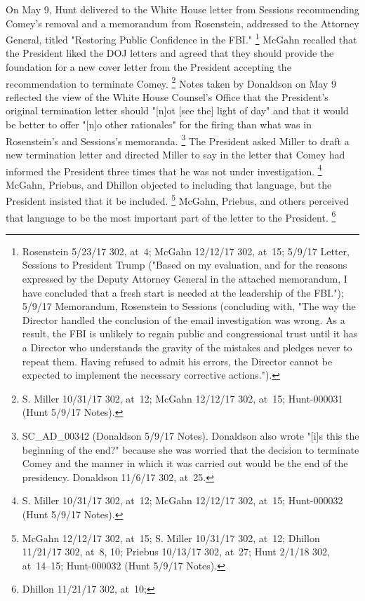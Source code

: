 {On May 9, Hunt delivered to the White House letter from Sessions recommending Comey's removal and a memorandum from Rosenstein, addressed to the Attorney General, titled "Restoring Public Confidence in the FBI."%
\footnote{Rosenstein 5/23/17 302, at~4;
McGahn 12/12/17 302, at~15;
5/9/17 Letter, Sessions to President Trump ("Based on my evaluation, and for the reasons expressed by the Deputy Attorney General in the attached memorandum, I have concluded that a fresh start is needed at the leadership of the FBI.");
5/9/17 Memorandum, Rosenstein to Sessions (concluding with, "The way the Director handled the conclusion of the email investigation was wrong.
As a result, the FBI is unlikely to regain public and congressional trust until it has a Director who understands the gravity of the mistakes and pledges never to repeat them.
Having refused to admit his errors, the Director cannot be expected to implement the necessary corrective actions.").}
McGahn recalled that the President liked the DOJ letters and agreed that they should provide the foundation for a new cover letter from the President accepting the recommendation to terminate Comey.%
\footnote{S. Miller 10/31/17 302, at~12;
McGahn 12/12/17 302, at~15;
Hunt-000031 (Hunt 5/9/17 Notes).}
Notes taken by Donaldson on May 9 reflected the view of the White House Counsel's Office that the President's original termination letter should "[n]ot [see the] light of day" and that it would be better to offer "[n]o other rationales" for the firing than what was in Rosenstein's and Sessions's memoranda.%
\footnote{SC\_AD\_00342 (Donaldson 5/9/17 Notes).
Donaldson also wrote "[i]s this the beginning of the end?" because she was worried that the decision to terminate Comey and the manner in which it was carried out would be the end of the presidency.
Donaldson 11/6/17 302, at~25.}
The President asked Miller to draft a new termination letter and directed Miller to say in the letter that Comey had informed the President three times that he was not under investigation.%
\footnote{S. Miller 10/31/17 302, at~12;
McGahn 12/12/17 302, at~15;
Hunt-000032 (Hunt 5/9/17 Notes).}
McGahn, Priebus, and Dhillon objected to including that language, but the President insisted that it be included.%
\footnote{McGahn 12/12/17 302, at~15;
S. Miller 10/31/17 302, at~12;
Dhillon 11/21/17 302, at~8, 10;
Priebus 10/13/17 302, at~27;
Hunt 2/1/18 302, at~14--15;
Hunt-000032 (Hunt 5/9/17 Notes).}
McGahn, Priebus, and others perceived that language to be the most important part of the letter to the President.%
\footnote{Dhillon 11/21/17 302, at~10;
}}
